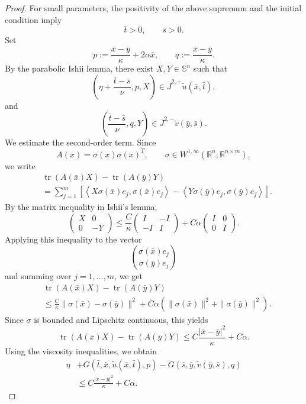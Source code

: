 \documentclass[preprint]{elsarticle}
\numberwithin{equation}{section}
\begin{document}
\begin{proof}
For small parameters, the positivity of the above supremum and the initial condition imply
\[
 \bar t>0,
 \qquad
 \bar s>0.
\]
Set
\[
 p:=\frac{\bar x-\bar y}{\kappa}+2\alpha\bar x,
 \qquad
 q:=\frac{\bar x-\bar y}{\kappa}.
\]
By the parabolic Ishii lemma, there exist \(X,Y\in\mathbb S^n\) such that
\[
 \left(
 \eta+\frac{\bar t-\bar s}{\nu},
 p,
 X
 \right)
 \in
 \overline{J}^{2,+}\widetilde u(\bar x,\bar t),
\]
and
\[
 \left(
 \frac{\bar t-\bar s}{\nu},
 q,
 Y
 \right)
 \in
 \overline{J}^{2,-}\widetilde v(\bar y,\bar s).
\]
We estimate the second-order term. Since
\[
 A(x)=\sigma(x)\sigma(x)^T,
 \qquad
 \sigma\in W^{1,\infty}(\mathbb R^n;\mathbb R^{n\times m}),
\]
we write
\[
\begin{aligned}
&\operatorname{tr}(A(\bar x)X)-\operatorname{tr}(A(\bar y)Y)\\
&=
\sum_{j=1}^m
\left[
\left\langle X\sigma(\bar x)e_j,\sigma(\bar x)e_j\right\rangle
-
\left\langle Y\sigma(\bar y)e_j,\sigma(\bar y)e_j\right\rangle
\right].
\end{aligned}
\]
By the matrix inequality in Ishii's lemma,
\[
 \begin{pmatrix}
 X & 0\\
 0 & -Y
 \end{pmatrix}
 \le
 \frac{C}{\kappa}
 \begin{pmatrix}
 I & -I\\
 -I & I
 \end{pmatrix}
 +
 C\alpha
 \begin{pmatrix}
 I & 0\\
 0 & I
 \end{pmatrix}.
\]
Applying this inequality to the vector
\[
 \binom{\sigma(\bar x)e_j}{\sigma(\bar y)e_j}
\]
and summing over \(j=1,\dots,m\), we get
\[
\begin{aligned}
&\operatorname{tr}(A(\bar x)X)-\operatorname{tr}(A(\bar y)Y)\\
&\le
\frac{C}{\kappa}
\|\sigma(\bar x)-\sigma(\bar y)\|^2
+
C\alpha
\left(
\|\sigma(\bar x)\|^2+\|\sigma(\bar y)\|^2
\right).
\end{aligned}
\]
Since \(\sigma\) is bounded and Lipschitz continuous, this yields
\[
 \operatorname{tr}(A(\bar x)X)-\operatorname{tr}(A(\bar y)Y)
 \le
 C\frac{|\bar x-\bar y|^2}{\kappa}+C\alpha.
\]
Using the viscosity inequalities, we obtain
\[
\begin{aligned}
 \eta
 &+
 G(\bar t,\bar x,\widetilde u(\bar x,\bar t),p)
 -
 G(\bar s,\bar y,\widetilde v(\bar y,\bar s),q) \\
 &\le
 C\frac{|\bar x-\bar y|^2}{\kappa}+C\alpha.

\end{aligned}\]
\end{proof}
\end{document}
